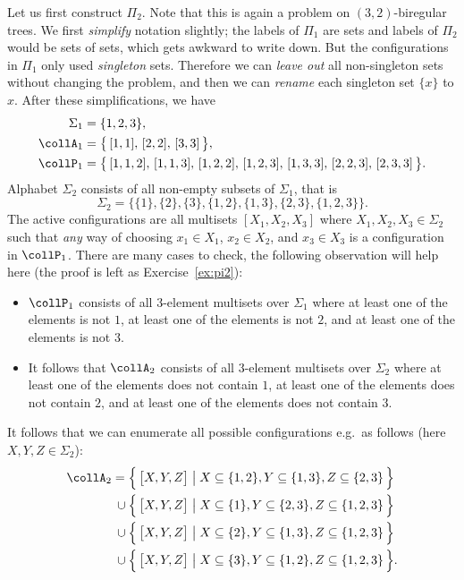 Let us first construct $\Pi_2$. Note that this is again a problem on $(3,2)$-biregular trees. We first \emph{simplify} notation slightly; the labels of $\Pi_1$ are sets and labels of $\Pi_2$ would be sets of sets, which gets awkward to write down. But the configurations in $\Pi_1$ only used \emph{singleton} sets. Therefore we can \emph{leave out} all non-singleton sets without changing the problem, and then we can \emph{rename} each singleton set $\{ x \}$ to $x$. After these simplifications, we have
\begin{align*}
	\Sigma_1 &= \{ 1,2,3 \}, \\
	\collA_1 &= \bigl\{\,
		[ 1, 1 ],\,
		[ 2, 2 ],\,
		[ 3, 3 ]
	\,\bigr\}, \\ 
	\collP_1 &= \bigl\{\,
		[ 1, 1, 2 ],\,
		[ 1, 1, 3 ],\,
		[ 1, 2, 2 ],\,
		[ 1, 2, 3 ],\,
		[ 1, 3, 3 ],\,
		[ 2, 2, 3 ],\,
		[ 2, 3, 3 ]
	\,\bigr\}.
\end{align*}
Alphabet $\Sigma_2$ consists of all non-empty subsets of $\Sigma_1$, that is 
\[
	\Sigma_2 = \bigl\{ \{ 1 \}, \{ 2 \}, \{ 3 \}, \{ 1, 2 \}, \{ 1, 3 \}, \{ 2, 3 \}, \{ 1, 2, 3 \} \bigr\}.
\]
The active configurations are all multisets $[X_1, X_2, X_3]$ where $X_1,X_2,X_3 \in \Sigma_2$ such that \emph{any} way of choosing $x_1 \in X_1$, $x_2 \in X_2$, and $x_3 \in X_3$ is a configuration in $\collP_1$. There are many cases to check, the following observation will help here (the proof is left as Exercise~\ref{ex:pi2}):
\begin{itemize}
	\item $\collP_1$ consists of all $3$-element multisets over $\Sigma_1$ where at least one of the elements is not $1$, at least one of the elements is not $2$, and at least one of the elements is not $3$.
	\item It follows that $\collA_2$ consists of all $3$-element multisets over $\Sigma_2$ where at least one of the elements does not contain $1$, at least one of the elements does not contain $2$, and at least one of the elements does not contain $3$.
\end{itemize}
It follows that we can enumerate all possible configurations e.g.\ as follows (here $X,Y,Z \in \Sigma_2$):
\begin{equation}\label{eq:pi2}
\begin{split}
	\collA_2
	      = {} &\Bigl\{ \, \bigl[ X, Y, Z \bigr] \bigm| X \subseteq \{1, 2\}, Y \subseteq \{ 1, 3 \}, Z \subseteq \{ 2, 3 \} \,\Bigr\} \\
	{} \cup {} &\Bigl\{ \, \bigl[ X, Y, Z \bigr] \bigm| X \subseteq \{1\}, Y \subseteq \{ 2, 3 \}, Z \subseteq \{ 1, 2, 3 \} \,\Bigr\} \\
	{} \cup {} &\Bigl\{ \, \bigl[ X, Y, Z \bigr] \bigm| X \subseteq \{2\}, Y \subseteq \{ 1, 3 \}, Z \subseteq \{ 1, 2, 3 \} \,\Bigr\} \\
	{} \cup {} &\Bigl\{ \, \bigl[ X, Y, Z \bigr] \bigm| X \subseteq \{3\}, Y \subseteq \{ 1, 2 \}, Z \subseteq \{ 1, 2, 3 \} \,\Bigr\}.
\end{split}
\end{equation}
